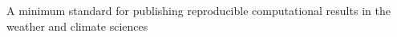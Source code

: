 A minimum standard for publishing reproducible computational results in the weather and climate sciences